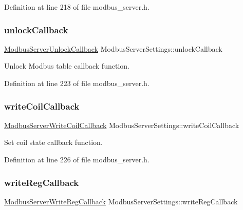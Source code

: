 Definition at line 218 of file modbus\+\_\+server.\+h.

\mbox{\label{structModbusServerSettings_ae3ae55909a636d05e82be40b638797ac}} 
\subsubsection{\texorpdfstring{unlock\+Callback}{unlockCallback}}
{\footnotesize\ttfamily \hyperlink{modbus__server_8h_ac238025fdae42e739fef8f16b2507444}{Modbus\+Server\+Unlock\+Callback} Modbus\+Server\+Settings\+::unlock\+Callback}



Unlock Modbus table callback function. 



Definition at line 223 of file modbus\+\_\+server.\+h.

\mbox{\label{structModbusServerSettings_a387f80bcdb0b1140d3f3e46b308be59d}} 
\subsubsection{\texorpdfstring{write\+Coil\+Callback}{writeCoilCallback}}
{\footnotesize\ttfamily \hyperlink{modbus__server_8h_a2116bb4e6258e6e41dd97272d1211cfd}{Modbus\+Server\+Write\+Coil\+Callback} Modbus\+Server\+Settings\+::write\+Coil\+Callback}



Set coil state callback function. 



Definition at line 226 of file modbus\+\_\+server.\+h.

\mbox{\label{structModbusServerSettings_ab35e47bf928ab662f9c4782dddb05527}} 
\subsubsection{\texorpdfstring{write\+Reg\+Callback}{writeRegCallback}}
{\footnotesize\ttfamily \hyperlink{modbus__server_8h_a5ca8502fc8d19f45c85f28fdddb89d3e}{Modbus\+Server\+Write\+Reg\+Callback} Modbus\+Server\+Settings\+::write\+Reg\+Callback}



